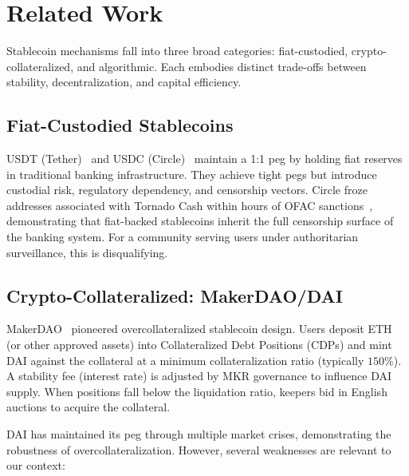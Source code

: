 \documentclass[11pt,a4paper]{article}
\begin{document}
\section{Related Work}
\label{sec:related}

Stablecoin mechanisms fall into three broad categories: fiat-custodied, crypto-collateralized, and algorithmic.
Each embodies distinct trade-offs between stability, decentralization, and capital efficiency.

\subsection{Fiat-Custodied Stablecoins}

USDT (Tether)~\citep{tether2023} and USDC (Circle)~\citep{circle2023} maintain a 1:1 peg by holding fiat reserves in traditional banking infrastructure.
They achieve tight pegs but introduce custodial risk, regulatory dependency, and censorship vectors.
Circle froze addresses associated with Tornado Cash within hours of OFAC sanctions~\citep{ofac2022}, demonstrating that fiat-backed stablecoins inherit the full censorship surface of the banking system.
For a community serving users under authoritarian surveillance, this is disqualifying.

\subsection{Crypto-Collateralized: MakerDAO/DAI}

MakerDAO~\citep{maker2020} pioneered overcollateralized stablecoin design.
Users deposit ETH (or other approved assets) into Collateralized Debt Positions (CDPs) and mint DAI against the collateral at a minimum collateralization ratio (typically $150\%$).
A stability fee (interest rate) is adjusted by MKR governance to influence DAI supply.
When positions fall below the liquidation ratio, keepers bid in English auctions to acquire the collateral.

DAI has maintained its peg through multiple market crises, demonstrating the robustness of overcollateralization.
However, several weaknesses are relevant to our context:
\end{document}
